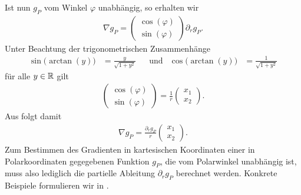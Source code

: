 Ist nun $g_P$ vom Winkel $\varphi$ unabhängig, so erhalten wir
\begin{align}
  \label{eq:gradInPolarCoordinates}
  \nabla g_P 
  = 
  \begin{pmatrix}
    \cos(\varphi)\\
    \sin(\varphi)
  \end{pmatrix}
  \partial_r g_P.
\end{align}
Unter Beachtung der trigonometrischen Zusammenhänge
\begin{align*}
  \sin\big(\arctan(y)\big) &= \frac{y}{\sqrt{1+y^2}} &&\text{und}
  &\cos\big(\arctan(y)\big) &= \frac{1}{\sqrt{1+y^2}}
\end{align*}
für alle $y\in\mathbb{R}$ gilt
\begin{align*}
  \begin{pmatrix}
    \cos(\varphi)\\
    \sin(\varphi)
  \end{pmatrix}
  = 
  \frac{1}{r}
  \begin{pmatrix}
    x_1\\
    x_2
  \end{pmatrix}\!.
\end{align*}
Aus  folgt damit
\begin{align*}
  \nabla g_P
  = 
  \frac{\partial_r g_P}{r}
  \begin{pmatrix}
    x_1\\
    x_2
  \end{pmatrix}\!.
\end{align*} 
Zum Bestimmen des Gradienten in kartesischen Koordinaten einer
in Polarkoordinaten gegegebenen Funktion $g_P$, die
vom Polarwinkel unabhängig ist, muss also lediglich 
die partielle Ableitung $\partial_r g_P$ berechnet werden.
Konkrete Beispiele formulieren wir in .
